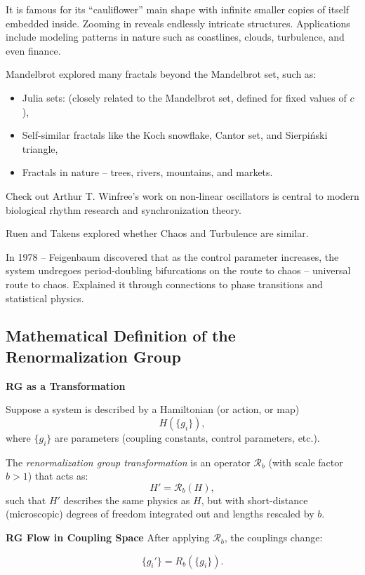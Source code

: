 It is famous for its ``cauliflower'' main shape with infinite smaller copies of itself embedded inside. Zooming in reveals endlessly intricate structures.
Applications include modeling patterns in nature such as coastlines, clouds, turbulence, and even finance.

Mandelbrot explored many fractals beyond the Mandelbrot set, such as:

\begin{itemize}
    \item Julia sets: (closely related to the Mandelbrot set, defined for fixed values of $c$),
    \item Self-similar fractals like the Koch snowflake, Cantor set, and Sierpiński triangle,
    \item Fractals in nature -- trees, rivers, mountains, and markets.
\end{itemize}

Check out Arthur T. Winfree's work on non-linear oscillators is central to
modern biological rhythm research and synchronization theory.

Ruen and Takens explored whether Chaos and Turbulence are similar.

In 1978 -- Feigenbaum discovered that as the control parameter increases, the system undregoes
period-doubling bifurcations on the route to chaos -- universal route to chaos. Explained it through
connections to phase transitions and statistical physics.

\subsection{Mathematical Definition of the Renormalization Group}

\textbf{RG as a Transformation}

Suppose a system is described by a Hamiltonian (or action, or map) 
\[
    H(\{g_i\}),
\]
where $\{g_i\}$ are parameters (coupling constants, control parameters, etc.).  

The \emph{renormalization group transformation} is an operator $\mathcal{R}_b$ (with scale factor $b > 1$) that acts as:
\[
    H' = \mathcal{R}_b(H),
\]
such that $H'$ describes the same physics as $H$, but with short-distance (microscopic) degrees of freedom integrated out and lengths rescaled by $b$.

\textbf{RG Flow in Coupling Space} After applying $\mathcal{R}_b$, the couplings change:

\[
    \{ g_i' \} = R_b(\{ g_i \}).
\]

